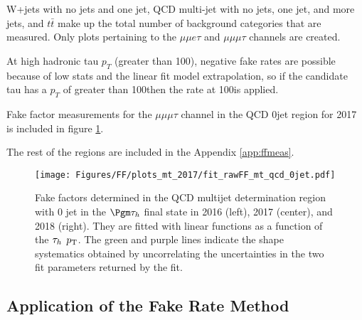 W+jets with no jets and one jet, QCD multi-jet with no jets, one jet, and more jets, and $t\bar{t}$ make up the total number of background categories that are measured. Only plots pertaining to the $\mu\mu e \tau$ and $\mu\mu \mu \tau$ channels are created. 

At high hadronic tau $p_T$ (greater than 100\GeV), negative fake rates are possible because of low stats and the linear fit model extrapolation, so if the candidate tau has a $p_T$ of greater than 100\GeV then the rate at 100\GeV is applied. 

Fake factor measurements for the $\mu\mu\mu\tau$ channel in the QCD 0jet region for 2017 is included in figure \ref{fig:fit_raw_mt_0jet_qcd}. 

The rest of the regions are included in the Appendix \ref{app:ffmeas}.




\begin{figure}[ht!b]
\centering
\texttt{[image: Figures/FF/plots\_mt\_2017/fit\_rawFF\_mt\_qcd\_0jet.pdf]}\\
\caption{\label{fig:fit_raw_mt_0jet_qcd} Fake factors determined in the QCD multijet determination region with 0 jet in the $\Pgm\tauh$ final state in 2016 (left), 2017 (center), and 2018 (right). They are fitted with linear functions as a function of the $\tau_h$ $p_{\mathrm{T}}$. The green and purple lines indicate the shape systematics obtained by uncorrelating the uncertainties in the two fit parameters returned by the fit.  }
\end{figure}





\clearpage

\subsection{Application of the Fake Rate Method}

